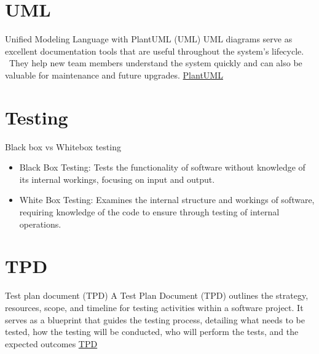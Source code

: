 \documentclass[10pt]{beamer}
\begin{document}
\section{UML}
\begin{frame} {Unified Modeling Language with PlantUML (UML)}
  UML diagrams serve as excellent documentation tools that are useful throughout the system's lifecycle. \
  They help new team members understand the system quickly and can also be valuable for maintenance and future upgrades.
  \href{https://plantuml.com/}{PlantUML}
\end{frame}


\section{Testing}
\begin{frame} {Black box vs Whitebox testing}
\begin{itemize}
  \item Black Box Testing: Tests the functionality of software without knowledge of its internal workings, focusing on input and output.
  \item White Box Testing: Examines the internal structure and workings of software, requiring knowledge of the code to ensure through testing of internal operations.
\end{itemize}
\end{frame}

\section{TPD}
\begin{frame} {Test plan document (TPD)}
  A Test Plan Document (TPD) outlines the strategy, resources, scope, and timeline for testing activities within a software project. It serves as a blueprint that guides the testing process, detailing what needs to be tested, how the testing will be conducted, who will perform the tests, and the expected outcomes
  \href{https://docs.google.com/document/d/1lC8ZuRmzqU7DRiWEhfb8iwjCS3WTwKQk/edit?usp=sharing&ouid=109808472061203912811&rtpof=true&sd=true}{TPD}
\end{frame}
\end{document}
